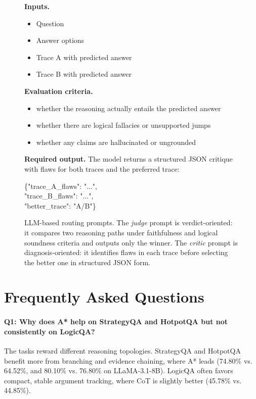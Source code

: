 \documentclass[11pt]{article}
\begin{document}
\begin{figure}[t]
\begin{minipage}[t]{0.485\textwidth}
\begin{tcolorbox}[promptcard,title=LLM-as-Critic]
\vspace{2pt}
\textbf{Inputs.}
\begin{itemize}
    \setlength{\itemsep}{1pt}
    \item Question
    \item Answer options
    \item Trace A with predicted answer
    \item Trace B with predicted answer
\end{itemize}

\vspace{-2pt}
\textbf{Evaluation criteria.}
\begin{itemize}
    \setlength{\itemsep}{1pt}
    \item whether the reasoning actually entails the predicted answer
    \item whether there are logical fallacies or unsupported jumps
    \item whether any claims are hallucinated or ungrounded
\end{itemize}

\vspace{-2pt}
\textbf{Required output.}
The model returns a structured JSON critique with flaws for both traces and the preferred trace:
\begin{center}
\ttfamily
\{"trace\_A\_flaws": "...",\\
"trace\_B\_flaws": "...",\\
"better\_trace": "A/B"\}
\end{center}
\end{tcolorbox}
\end{minipage}

\vspace{2pt}
\caption{LLM-based routing prompts. The \emph{judge} prompt is verdict-oriented: it compares two reasoning paths under faithfulness and logical soundness criteria and outputs only the winner. The \emph{critic} prompt is diagnosis-oriented: it identifies flaws in each trace before selecting the better one in structured JSON form.}
\label{fig:judge_critic_prompts}
\end{figure}


\section{Frequently Asked Questions}
\label{app:faq}

\paragraph{Q1: Why does A* help on StrategyQA and HotpotQA but not consistently on LogicQA?}
The tasks reward different reasoning topologies. StrategyQA and HotpotQA benefit more from branching and evidence chaining, where A* leads (74.80\% vs. 64.52\%, and 80.10\% vs. 76.80\% on LLaMA-3.1-8B). LogicQA often favors compact, stable argument tracking, where CoT is slightly better (45.78\% vs. 44.85\%).
\end{document}
